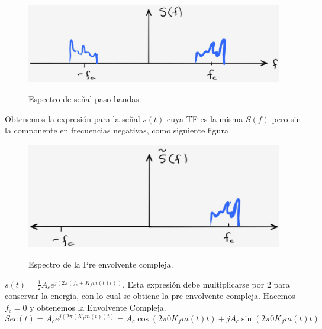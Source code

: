 \begin{figure}[h!]
	\captionsetup{justification = raggedright, singlelinecheck = false}
	\caption{Espectro de señal paso bandas.} 
	\centering
	\includegraphics[scale=1]{Imagenes/Espectro-pasobanda.png}
	\label{fig:Espectro-pasobanda}
\end{figure}

Obtenemos la expresión para la señal $s(t)$ cuya TF es la misma $S(f)$ pero sin  la componente en frecuencias negativas, como  siguiente figura \\

\vspace{200px}
\begin{figure}[h!]
	\captionsetup{justification = raggedright, singlelinecheck = false}
	\caption{Espectro de la Pre envolvente compleja.} 
	\centering
	\includegraphics[scale=1]{Imagenes/Espectro-pre.png}
	\label{fig:Espectro-pre}
\end{figure}

$s(t)= \frac{1}{2}A_{c}e^{j(2\pi(f_{c}+K_{f}m(t)t))}.$ Esta expresión debe multiplicarse por 2 para conservar la energía, con lo cual se obtiene la pre-envolvente compleja. Hacemos $f_{c}=0$ y obtenemos la Envolvente Compleja.\\ 

\begin{equation} \label{capdos_seis}
	Sec(t)= A_{c}e^{j(2\pi(K_{f}m(t))t)} = A_{c}\cos(2\pi 0K_{f}m(t)t) + jA_{c}\sin(2\pi 0K_{f}m(t)t) 
\end{equation}

